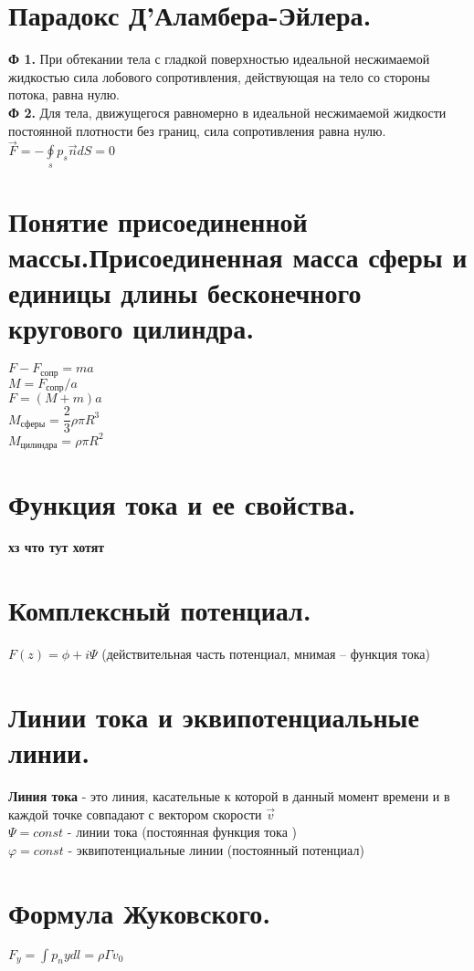 \begin{multicols*}{4}
		\section{Парадокс Д’Аламбера-Эйлера.}
		\textbf{Ф 1.} При обтекании тела с гладкой поверхностью идеальной
		несжимаемой жидкостью сила лобового сопротивления, действующая на тело
		со стороны потока, равна нулю. \\
		\textbf{Ф 2.} Для тела, движущегося равномерно в идеальной несжимаемой жидкости постоянной плотности без границ, сила сопротивления равна
		нулю.\\
		$\vec{F}=-\oint\limits_sp_s\vec{n}dS=0$
		
		\section{Понятие присоединенной массы.Присоединенная масса сферы и единицы длины бесконечного кругового цилиндра.}
		$F-F_\text{сопр}=ma$ \\
		$M=F_\text{сопр}/a$ \\
		$F=(M+m)a$ \\ 
		$M_\text{сферы}=\dfrac{2}{3}\rho\pi R^3$ \\
		$M_\text{цилиндра}=\rho\pi R^2$ \\
		
		\section{Функция тока и ее свойства.}
		\textbf{хз что тут хотят}
		
		\section{Комплексный потенциал.}
		$F(z)=\phi+i\Psi$ (действительная часть
		потенциал, мнимая – функция тока)
		
		\section{Линии тока и эквипотенциальные линии.}
		\textbf{Линия тока} - это линия, касательные к которой в данный момент времени и
		в каждой точке совпадают с вектором скорости  $\vec{v}$ \\
		
		$\Psi = const$ - линии тока (постоянная функция тока ) \\
		$\varphi = const$ - эквипотенциальные линии (постоянный потенциал)
		
		\section{Формула Жуковского.}
		$F_y=\int p_nydl=\rho\Gamma v_0$
		

\end{multicols*}
